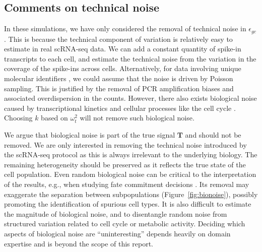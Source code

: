 \documentclass[10pt,letterpaper]{article}
\begin{document}
\subsection{Comments on technical noise}
In these simulations, we have only considered the removal of technical noise in $\epsilon_{gc}$.
This is because the technical component of variation is relatively easy to estimate in real scRNA-seq data.
We can add a constant quantity of spike-in transcripts to each cell, and estimate the technical noise from the variation in the coverage of the spike-ins across cells.
Alternatively, for data involving unique molecular identifiers \cite{islam2014quantitative}, we could assume that the noise is driven by Poisson sampling.
This is justified by the removal of PCR amplification biases and associated overdispersion in the counts.
However, there also exists biological noise caused by transcriptional kinetics \cite{kim2013inferring} and cellular processes like the cell cycle \cite{scialdone2015computational}.
Choosing $k$ based on $\omega^2_t$ will not remove such biological noise.

We argue that biological noise is part of the true signal $\mathbf{T}$ and should not be removed.
We are only interested in removing the technical noise introduced by the scRNA-seq protocol as this is always irrelevant to the underlying biology.
The remaining heterogeneity should be preserved as it reflects the true state of the cell population.
Even random biological noise can be critical to the interpretation of the results, e.g., when studying fate commitment decisions \cite{balazsi2011cellular}.
Its removal may exaggerate the separation between subpopulations (Figure~\ref{fig:bionoise}), possibly promoting the identification of spurious cell types.
It is also difficult to estimate the magnitude of biological noise, and to disentangle random noise from structured variation related to cell cycle or metabolic activity.
Deciding which aspects of biological noise are ``uninteresting'' depends heavily on domain expertise and is beyond the scope of this report.
\end{document}
